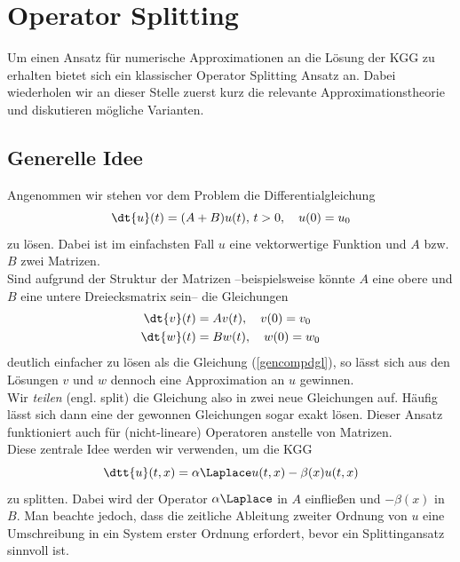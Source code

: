 \section{Operator Splitting}
Um einen Ansatz für numerische Approximationen an die Lösung der KGG zu erhalten bietet sich ein klassischer Operator Splitting Ansatz an. Dabei wiederholen wir an dieser Stelle zuerst kurz die relevante Approximationstheorie und diskutieren mögliche Varianten.
\subsection{Generelle Idee}
Angenommen wir stehen vor dem Problem die Differentialgleichung 
\begin{equation}
\label{gencompdgl}
\dt{u}(t)=(A+B)u(t), \, t>0, \quad u(0)=u_0
\end{equation}
zu lösen. Dabei ist im einfachsten Fall $u$ eine vektorwertige Funktion und $A$ bzw. $B$ zwei Matrizen.\\
Sind aufgrund der Struktur der Matrizen --beispielsweise könnte $A$ eine obere und $B$ eine untere Dreiecksmatrix sein-- die Gleichungen 
\begin{align*}
\dt{v}(t)&=Av(t), \quad v(0)=v_0\\
\dt{w}(t)&=Bw(t), \quad w(0)=w_0
\end{align*}
deutlich einfacher zu lösen als die Gleichung (\ref{gencompdgl}), so lässt sich aus den Lösungen $v$ und $w$ dennoch eine Approximation an $u$ gewinnen.\\
Wir \emph{teilen} (engl. split) die Gleichung also in zwei neue Gleichungen auf. Häufig lässt sich dann eine der gewonnen Gleichungen sogar exakt lösen. Dieser Ansatz funktioniert auch für (nicht-lineare) Operatoren anstelle von Matrizen.\\
Diese zentrale Idee werden wir verwenden, um die KGG 
\begin{equation*}
\dtt{u}(t,x)=\alpha\Laplace u(t,x)-\beta(x)u(t,x)
\end{equation*}
zu splitten. Dabei wird der Operator $\alpha\Laplace$ in $A$ einfließen und $-\beta(x)$ in $B$. Man beachte jedoch, dass die zeitliche Ableitung zweiter Ordnung von $u$ eine Umschreibung in ein System erster Ordnung erfordert, bevor ein Splittingansatz sinnvoll ist.

